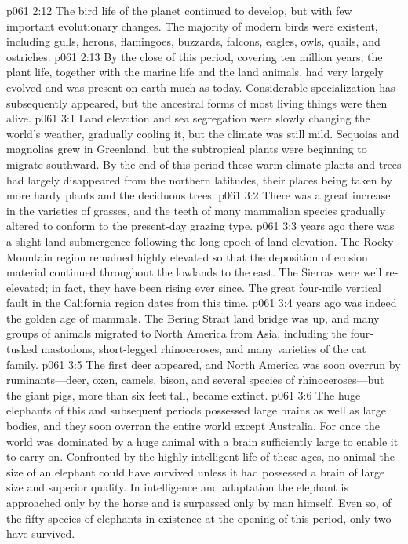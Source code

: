 \vs p061 2:12 The bird life of the planet continued to develop, but with few important evolutionary changes. The majority of modern birds were existent, including gulls, herons, flamingoes, buzzards, falcons, eagles, owls, quails, and ostriches.
\pc \vs p061 2:13 By the close of this  period, covering ten million years, the plant life, together with the marine life and the land animals, had very largely evolved and was present on earth much as today. Considerable specialization has subsequently appeared, but the ancestral forms of most living things were then alive.
\vs p061 3:1 Land elevation and sea segregation were slowly changing the world’s weather, gradually cooling it, but the climate was still mild. Sequoias and magnolias grew in Greenland, but the subtropical plants were beginning to migrate southward. By the end of this period these warm\hyp{}climate plants and trees had largely disappeared from the northern latitudes, their places being taken by more hardy plants and the deciduous trees.
\vs p061 3:2 There was a great increase in the varieties of grasses, and the teeth of many mammalian species gradually altered to conform to the present\hyp{}day grazing type.
\pc \vs p061 3:3  years ago there was a slight land submergence following the long epoch of land elevation. The Rocky Mountain region remained highly elevated so that the deposition of erosion material continued throughout the lowlands to the east. The Sierras were well re\hyp{}elevated; in fact, they have been rising ever since. The great four\hyp{}mile vertical fault in the California region dates from this time.
\pc \vs p061 3:4  years ago was indeed the golden age of mammals. The Bering Strait land bridge was up, and many groups of animals migrated to North America from Asia, including the four\hyp{}tusked mastodons, short\hyp{}legged rhinoceroses, and many varieties of the cat family.
\vs p061 3:5 The first deer appeared, and North America was soon overrun by ruminants---deer, oxen, camels, bison, and several species of rhinoceroses---but the giant pigs, more than six feet tall, became extinct.
\vs p061 3:6 The huge elephants of this and subsequent periods possessed large brains as well as large bodies, and they soon overran the entire world except Australia. For once the world was dominated by a huge animal with a brain sufficiently large to enable it to carry on. Confronted by the highly intelligent life of these ages, no animal the size of an elephant could have survived unless it had possessed a brain of large size and superior quality. In intelligence and adaptation the elephant is approached only by the horse and is surpassed only by man himself. Even so, of the fifty species of elephants in existence at the opening of this period, only two have survived.\plusone
